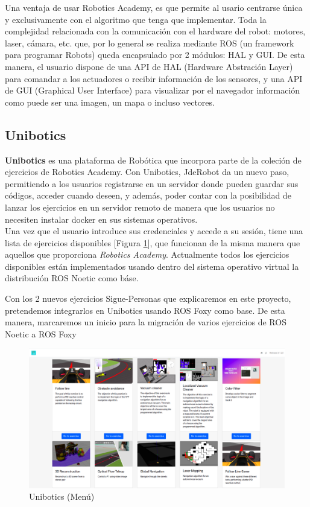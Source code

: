 Una ventaja de usar Robotics Academy, es que permite al usario centrarse única y exclusivamente con el algoritmo que tenga que implementar. Toda la complejidad relacionada con la comunicación con el hardware del robot: motores, laser, cámara, etc. que, por lo general se realiza mediante ROS (un framework para programar Robots) queda encapsulado por 2 módulos: HAL y GUI. De esta manera, el usuario dispone de una API de HAL (Hardware Abstración Layer) para comandar a los actuadores o recibir información de los sensores, y una API de GUI (Graphical User Interface) para visualizar por el navegador información como puede ser una imagen, un mapa o incluso vectores.\\

\subsection{Unibotics}
\label{sec:unibotics}

\textbf{Unibotics} es una plataforma de Robótica que incorpora parte de la coleción de ejercicios de Robotics Academy. Con Unibotics, JdeRobot da un nuevo paso, permitiendo a los usuarios registrarse en un servidor donde pueden guardar sus códigos, acceder cuando deseen, y además, poder contar con la posibilidad de lanzar los ejercicios en un servidor remoto de manera que los usuarios no necesiten instalar docker en sus sistemas operativos.\\

Una vez que el usuario introduce sus credenciales y accede a su sesión, tiene una lista de ejercicios disponibles [Figura \ref{fig:menu-unibotics}], que funcionan de la misma manera que aquellos que proporciona \textit{Robotics Academy}. Actualmente todos los ejercicios disponibles están implementados usando dentro del sistema operativo virtual la distribución ROS Noetic como báse.

Con los 2 nuevos ejercicios Sigue-Personas que explicaremos en este proyecto, pretendemos integrarlos en Unibotics usando ROS Foxy como base. De esta manera, marcaremos un inicio para la migración de varios ejercicios de ROS Noetic a ROS Foxy

\begin{figure} [H]
  \begin{center}
    \includegraphics[width=15cm]{imagenes/unibotics-menu.png}
  \end{center}
  \caption[Unibotics (Menú)]{Unibotics (Menú)}
  \label{fig:menu-unibotics}
\end{figure}




